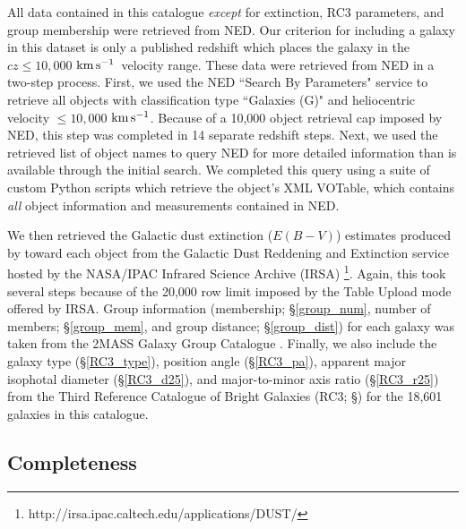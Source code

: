 \documentclass[twocolumn,tighten]{aastex62}
\newcommand{\kms}{$\rm km\, s^{-1}$}
\begin{document}
All data contained in this catalogue \emph{except} for extinction, RC3 parameters, and group membership were retrieved from NED. Our criterion for including a galaxy in this dataset is only a published redshift which places the galaxy in the $cz \leq 10,000$ \kms~velocity range.  These data were retrieved from NED in a two-step process. First, we used the NED ``Search By Parameters" service to retrieve all objects with classification type ``Galaxies (G)" and heliocentric velocity $\leq 10,000$ \kms. Because of a 10,000 object retrieval cap imposed by NED, this step was completed in 14 separate redshift steps. Next, we used the retrieved list of object names to query NED for more detailed information than is available through the initial search. We completed this query using a suite of custom Python scripts which retrieve the object's XML VOTable, which contains \emph{all} object information and measurements contained in NED. 

We then retrieved the Galactic dust extinction ($E(B-V)$) estimates produced by \cite{schlafly2011} toward each object from the Galactic Dust Reddening and Extinction service hosted by the NASA/IPAC Infrared Science Archive (IRSA) \footnote{http://irsa.ipac.caltech.edu/applications/DUST/}. Again, this took several steps because of the 20,000 row limit imposed by the Table Upload mode offered by IRSA. Group information (membership; \S \ref{group_num}, number of members; \S \ref{group_mem}, and group distance; \S \ref{group_dist}) for each galaxy was taken from the 2MASS Galaxy Group Catalogue \cite{tully2015}. Finally, we also include the galaxy type (\S \ref{RC3_type}), position angle (\S \ref{RC3_pa}), apparent major isophotal diameter (\S \ref{RC3_d25}), and major-to-minor axis ratio (\S \ref{RC3_r25}) from the Third Reference Catalogue of Bright Galaxies (RC3; \S \citealt{RC3}) for the 18,601 galaxies in this catalogue.

\subsection{Completeness} \label{completeness}
\end{document}
